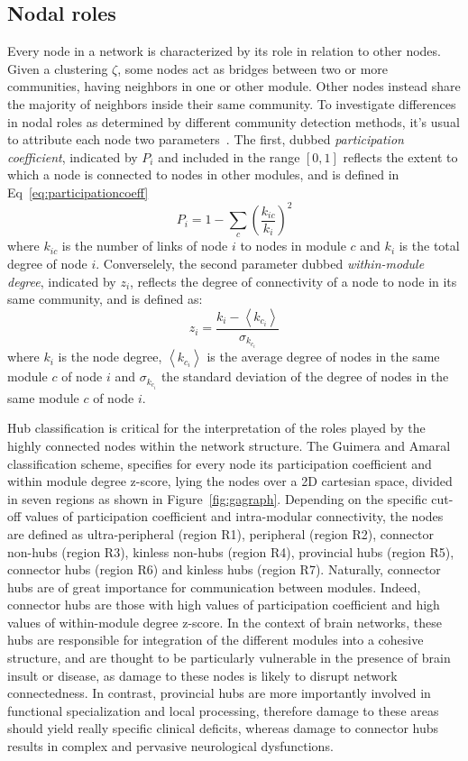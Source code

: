\subsection{Nodal roles}
Every node in a network is characterized by its role in relation to other nodes. Given a clustering $\zeta$, some nodes act as bridges between two or more communities, having neighbors in one or other module. Other nodes instead share the majority of neighbors inside their same community.
To investigate differences in nodal roles as determined by different community detection methods, it's usual to attribute each node two parameters~\cite{guimera2005}.
The first, dubbed \emph{participation coefficient}, indicated by $P_i$ and included in the range $[0,1]$ reflects the extent to which a node is connected to nodes in other modules, and is defined in Eq~\ref{eq:participationcoeff} 
\begin{equation}\label{eq:participationcoeff}
P_i = 1 - \sum_c \left( \frac{k_{ic}}{k_i} \right)^2
\end{equation}
where $k_{ic}$ is the number of links of node $i$ to nodes in module $c$ and $k_i$ is the total degree of node $i$.
Converselely, the second parameter dubbed \emph{within-module degree}, indicated by $z_i$,  reflects the degree of connectivity of a node to node in its same community, and is defined as: 
\begin{equation}\label{eq:withinmoduledegree}
z_i = \frac{k_i - \left< k_{c_i} \right>}{\sigma_{k_{c_i}}}
\end{equation}
where $k_i$ is the node degree,  $\left< k_{c_i} \right>$ is the average degree of nodes in the same module $c$ of node $i$ and $\sigma_{k_{c_i}}$ the standard deviation of the degree of nodes in the same module $c$ of node $i$.

Hub classification is critical for the interpretation of the roles played by the highly connected nodes within the network structure.
The Guimera and Amaral~\cite{guimera2005} classification scheme, specifies for every node its participation coefficient and within module degree z-score, lying the nodes over a 2D cartesian space, divided in seven regions as shown in Figure~\ref{fig:gagraph}.
Depending on the specific cut-off values of participation coefficient and intra-modular connectivity, the nodes are defined as ultra-peripheral (region R1), peripheral (region R2), connector non-hubs (region R3), kinless non-hubs (region R4), provincial hubs (region R5), connector hubs (region R6) and kinless hubs (region R7). Naturally, connector hubs are of great importance for communication between modules.
Indeed, connector hubs are those with high values of participation coefficient and high values of within-module degree z-score.
In the context of brain networks, these hubs are responsible for integration of the different modules into a cohesive structure, and are thought to be particularly vulnerable in the presence of brain insult or disease, as damage to these nodes is likely to disrupt network connectedness.
In contrast, provincial hubs are more importantly involved in functional specialization and local processing, therefore damage to these areas should yield really specific clinical deficits, whereas damage to connector hubs results in complex and pervasive neurological dysfunctions.


